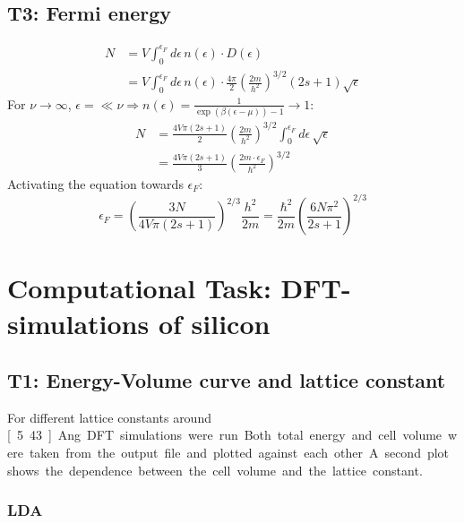 \documentclass[12pt,a4paper]{scrartcl}
\begin{document}
\subsection{T3: Fermi energy}
\begin{align*}
N &= V \int_0^{\epsilon_F} d\epsilon \, n(\epsilon) \cdot D(\epsilon) \\
&= V \int_0^{\epsilon_F} d\epsilon \, n(\epsilon) \cdot \frac{4\pi}{2} \left(\frac{2m}{h^2}\right)^{3/2} (2s+1) \sqrt{\epsilon}
\end{align*}
For $\nu \rightarrow \infty$, $\epsilon = \ll \nu \Rightarrow n(\epsilon) = \frac{1}{\exp\left(\beta(\epsilon-\mu)\right)-1} \rightarrow 1$:
\begin{align*}
N &= \frac{4V\pi(2s+1)}{2} \left(\frac{2m}{h^2}\right)^{3/2} \int_0^{\epsilon_F} d\epsilon \, \sqrt{\epsilon} \\
&= \frac{4V\pi(2s+1)}{3} \left(\frac{2m\cdot \epsilon_F}{h^2}\right)^{3/2}
\end{align*}
Activating the equation towards $\epsilon_F$:
\begin{equation}
\epsilon_F = \left(\frac{3N}{4V\pi(2s+1)}\right)^{2/3} \frac{h^2}{2m} = \frac{\hbar^2}{2m} \left(\frac{6N\pi^2}{2s+1}\right)^{2/3}
\end{equation}

\section{Computational Task: DFT- simulations of silicon}

\subsection{T1: Energy-Volume curve and lattice constant}

For different lattice constants around \unit[5.43]{Ang} DFT simulations were run. Both total energy and cell volume were taken from the output file and plotted against each other. A second plot shows the dependence between the cell volume and the lattice constant.

\subsubsection{LDA}
\end{document}

